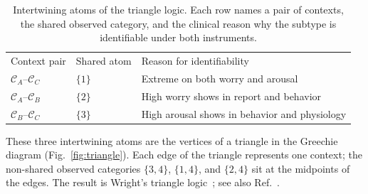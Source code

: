 \documentclass[aps,pra,twocolumn,superscriptaddress,floatfix,longbibliography]{revtex4-2}
\begin{document}
\begin{table}[htb]
\caption{\label{tab:intertwine_clinical}Intertwining atoms of the
triangle logic. Each row names a pair of contexts, the shared
observed category, and the clinical reason why the subtype is
identifiable under both instruments.}
\begin{ruledtabular}
\begin{tabular}{lll}
Context pair & Shared atom & Reason for identifiability\\
\colrule
$\mathcal{C}_A$--$\mathcal{C}_C$ & $\{1\}$ &
  Extreme on both worry and arousal\\
$\mathcal{C}_A$--$\mathcal{C}_B$ & $\{2\}$ &
  High worry shows in report and behavior\\
$\mathcal{C}_B$--$\mathcal{C}_C$ & $\{3\}$ &
  High arousal shows in behavior and physiology\\
\end{tabular}
\end{ruledtabular}
\end{table}

These three intertwining atoms are the vertices of a triangle in the
Greechie diagram (Fig.~\ref{fig:triangle}). Each edge of the triangle
represents one context; the non-shared observed categories
$\{3,4\}$, $\{1,4\}$, and $\{2,4\}$ sit at the midpoints of the
edges. The result is Wright's triangle logic~\cite[Figure~2,
p.~900]{wright}; see also Ref.~\cite[Fig.~6, Example~8.2,
pp.~414,420,421]{dvur-pul-svo}.
\end{document}
